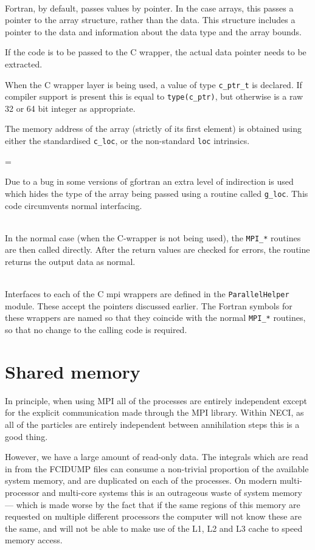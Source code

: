 \documentclass[a4paper,notitlepage]{scrreprt}
\newcommand\headitem[1]{\needspace{1.5\baselineskip}\item[{\boldmath #1 \nopagebreak}] \hfill \\ \nopagebreak}
\let\code\lstinline
\newenvironment{warningbox}
	{\par\begin{mdframed}[%
		linewidth = 2pt, %
	    linecolor = red, %
	    roundcorner = 6pt, %
		backgroundcolor = gray!20
	]\begin{list}{}{\leftmargin=1cm
			           \labelwidth=\leftmargin}\item[\Large\ding{43}]}
	{\end{list}\end{mdframed}\par}
\begin{document}
{{{\begin{description}
		\headitem{Conversion to pointers}
			Fortran, by default, passes values by pointer. In the case
			arrays, this passes a pointer to the array structure, rather
			than the data. This structure includes a pointer to the data
			and information about the data type and the array bounds.

			If the code is to be passed to the C wrapper, the actual
			data pointer needs to be extracted.

			When the C wrapper layer is being used, a value of type
			\code{c_ptr_t} is declared. If compiler support is
			present this is equal to \code{type(c_ptr)}, but otherwise
			is a raw 32 or 64 bit integer as appropriate.

			The memory address of the array (strictly of its first
			element) is obtained using either the standardised
			\code{c_loc}, or the non-standard \code{loc}
			intrinsics.

			\begin{warningbox}
			Due to a bug in some versions of gfortran an
			extra level of indirection is used which hides the type
			of the array being passed using a routine called
			\code{g_loc}. This code circumvents normal interfacing.
			\end{warningbox}

		\headitem{Calls to MPI}
			In the normal case (when the C-wrapper is not being
			used), the \code{MPI_*} routines are then called directly.
			After the return values are checked for errors, the
			routine returns the output data as normal.

		\headitem{C wrapper layer}
			Interfaces to each of the C mpi wrappers are defined in
			the \code{ParallelHelper} module. These accept the
			pointers discussed earlier. The Fortran symbols for these
			wrappers are named so that they coincide with the normal
			\code{MPI_*} routines, so that no change to the calling
			code is required.

	\end{description}

\section{Shared memory}
	In principle, when using MPI all of the processes are entirely independent
	except for the explicit communication made through the MPI library. Within
	NECI, as all of the particles are entirely independent between annihilation
	steps this is a good thing.

	However, we have a large amount of read-only data. The integrals which are
	read in from the FCIDUMP files can consume a non-trivial proportion of the
	available system memory, and are duplicated on each of the processes. On
	modern multi-processor and multi-core systems this is an outrageous waste
	of system memory --- which is made worse by the fact that if the same
	regions of this memory are requested on multiple different processors the
	computer will not know these are the same, and will not be able to make use
	of the L1, L2 and L3 cache to speed memory access.

}}}
\end{document}
